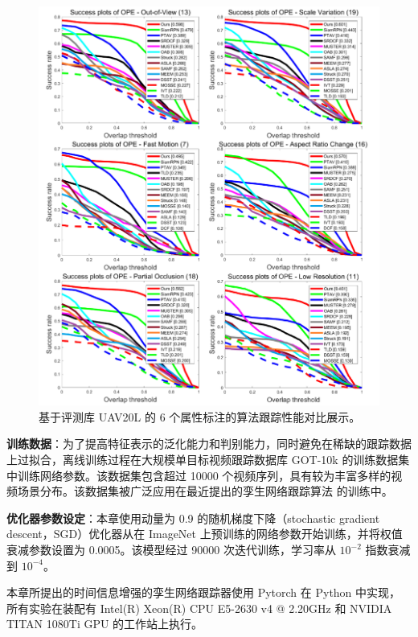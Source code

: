 \begin{figure}[t!]
    \centering
    \includegraphics[width=1.0\textwidth]{Img/end/UAV20L_2.pdf}
    \caption{基于评测库 UAV20L \cite{mueller2016benchmark} 的 6 个属性标注的算法跟踪性能对比展示。}
    \label{fig:end_uav20l_attr_2}
\end{figure}

\textbf{训练数据}：为了提高特征表示的泛化能力和判别能力，同时避免在稀缺的跟踪数据上过拟合，离线训练过程在大规模单目标视频跟踪数据库 GOT-10k \cite{GOT-10k} 的训练数据集中训练网络参数。该数据集包含超过 10000 个视频序列，具有较为丰富多样的视频场景分布。该数据集被广泛应用在最近提出的孪生网络跟踪算法 \cite{SiamFC++} 的训练中。

\textbf{优化器参数设定}：本章使用动量为 0.9 的随机梯度下降（stochastic gradient descent，SGD）优化器从在 ImageNet 上预训练的网络参数开始训练，并将权值衰减参数设置为 0.0005。该模型经过 90000 次迭代训练，学习率从 $10^{-2}$ 指数衰减到 $10^{-4}$。

本章所提出的时间信息增强的孪生网络跟踪器使用 Pytorch 在 Python 中实现，所有实验在装配有 Intel(R) Xeon(R) CPU E5-2630 v4 @ 2.20GHz 和 NVIDIA TITAN 1080Ti GPU 的工作站上执行。


